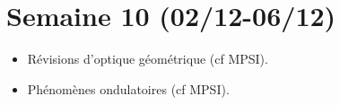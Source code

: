 \section{Semaine 10 (02/12-06/12) }


\begin{itemize}
	\item Révisions d'optique géométrique (cf MPSI).
	\item Phénomènes ondulatoires (cf MPSI).
\end{itemize}